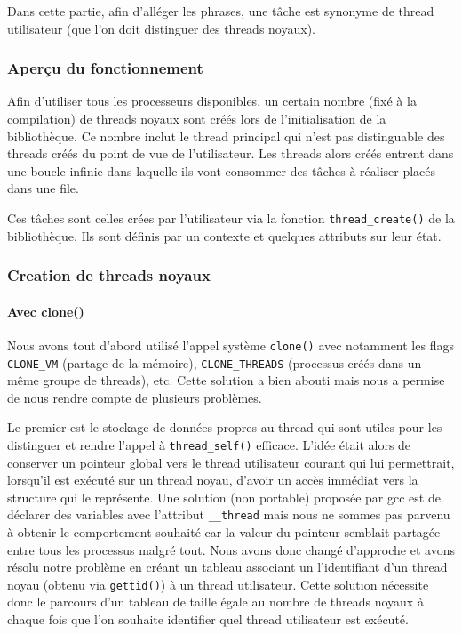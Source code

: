Dans cette partie, afin d'alléger les phrases, une tâche est synonyme de thread utilisateur (que l'on doit distinguer des threads noyaux).

\subsubsection{Aperçu du fonctionnement}

Afin d'utiliser tous les processeurs disponibles, un certain nombre (fixé à la compilation) de threads noyaux sont créés lors de l'initialisation de la bibliothèque. Ce nombre inclut le thread principal qui n'est pas distinguable des threads créés du point de vue de l'utilisateur. Les threads alors créés entrent dans une boucle infinie dans laquelle ils vont consommer des tâches à réaliser placés dans une file.

Ces tâches sont celles crées par l'utilisateur via la fonction \verb!thread_create()! de la bibliothèque. Ils sont définis par un contexte et quelques attributs sur leur état.


\subsubsection{Creation de threads noyaux}

\paragraph{Avec clone()}
Nous avons tout d'abord utilisé l'appel système \verb!clone()! avec notamment les flags \verb!CLONE_VM! (partage de la mémoire), \verb!CLONE_THREADS! (processus créés dans un même groupe de threads), etc. Cette solution a bien abouti mais nous a permise de nous rendre compte de plusieurs problèmes.

Le premier est le stockage de données propres au thread qui sont utiles pour les distinguer et rendre l'appel à \verb!thread_self()! efficace. L'idée était alors de conserver un pointeur global vers le thread utilisateur courant qui lui permettrait, lorsqu'il est exécuté sur un thread noyau, d'avoir un accès immédiat vers la structure qui le représente. Une solution (non portable) proposée par gcc est de déclarer des variables avec l'attribut \verb!__thread! mais nous ne sommes pas parvenu à obtenir le comportement souhaité car la valeur du pointeur semblait partagée entre tous les processus malgré tout. Nous avons donc changé d'approche et avons résolu notre problème en créant un tableau associant un l'identifiant d'un thread noyau (obtenu via \verb!gettid()!) à un thread utilisateur. Cette solution nécessite donc le parcours d'un tableau de taille égale au nombre de threads noyaux à chaque fois que l'on souhaite identifier quel thread utilisateur est exécuté.


